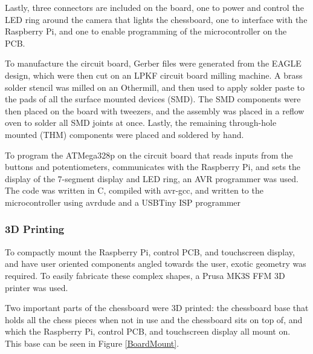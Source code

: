 \documentclass[journal]{IEEEtran}
\begin{document}
Lastly, three connectors are included on the board, one to power and control the LED ring around the camera that lights the chessboard, one to interface with the Raspberry Pi, and one to enable programming of the microcontroller on the PCB.


To manufacture the circuit board, Gerber files were generated from the EAGLE design, which were then cut on an LPKF circuit board milling machine. A brass solder stencil was milled on an Othermill, and then used to apply solder paste to the pads of all the surface mounted devices (SMD). The SMD components were then placed on the board with tweezers, and the assembly was placed in a reflow oven to solder all SMD joints at once. Lastly, the remaining through-hole mounted (THM) components were placed and soldered by hand.

To program the ATMega328p on the circuit board that reads inputs from the buttons and potentiometers, communicates with the Raspberry Pi, and sets the display of the 7-segment display and LED ring, an AVR programmer was used. The code was written in C, compiled with avr-gcc, and written to the microcontroller using avrdude and a USBTiny ISP programmer

\vspace{12pt}

\subsubsection{3D Printing}
To compactly mount the Raspberry Pi, control PCB, and touchscreen display, and have user oriented components angled towards the user, exotic geometry was required. To easily fabricate these complex shapes, a Prusa MK3S FFM 3D printer was used.

Two important parts of the chessboard were 3D printed: the chessboard base that holds all the chess pieces when not in use and the chessboard sits on top of, and which the Raspberry Pi, control PCB, and touchscreen display all mount on. This base can be seen in Figure \ref{BoardMount}. 
\end{document}
